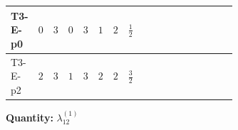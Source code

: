 \documentclass[8pt]{article}
\begin{document}
\begin{landscape}
\begin{longtable}{@{}llcccccc >{\raggedright\arraybackslash}p{0.21\linewidth} >{\raggedright\arraybackslash}p{0.21\linewidth} >{\raggedright\arraybackslash}p{0.21\linewidth}@{}}
T3-E-p0 & $0$ & $3$ & $0$ & $3$ & $1$ & $2$ & $\frac{1}{2}$ & \scriptsize\adjustbox{max width=\linewidth}{$\begin{gathered} +{g_1}^2 (-6 {\lambda_{12}^{(1)}}-4 {\lambda_{12}^{(\times)}})\end{gathered}$} & \scriptsize\adjustbox{max width=\linewidth}{$\begin{gathered} +{\lambda_{S_1}^{(1)}} \left(8 {\lambda_{12}^{(1)}}+\frac{16 {\lambda_{12}^{(\times)}}}{3}\right)\end{gathered}$} & \scriptsize\adjustbox{max width=\linewidth}{$\begin{gathered} +{\lambda_{S_2}^{(1)}} \left(8 {\lambda_{12}^{(1)}}+\frac{16 {\lambda_{12}^{(\times)}}}{3}\right)\end{gathered}$} \\
\midrule
T3-E-p2 & $2$ & $3$ & $1$ & $3$ & $2$ & $2$ & $\frac{3}{2}$ & \scriptsize\adjustbox{max width=\linewidth}{$\begin{gathered} +{g_1}^2 (-30 {\lambda_{12}^{(1)}}-20 {\lambda_{12}^{(\times)}})\end{gathered}$} & \scriptsize\adjustbox{max width=\linewidth}{$\begin{gathered} +{\lambda_{S_1}^{(1)}} \left(8 {\lambda_{12}^{(1)}}+\frac{16 {\lambda_{12}^{(\times)}}}{3}\right)\end{gathered}$} & \scriptsize\adjustbox{max width=\linewidth}{$\begin{gathered} +{\lambda_{S_2}^{(1)}} \left(8 {\lambda_{12}^{(1)}}+\frac{16 {\lambda_{12}^{(\times)}}}{3}\right)\end{gathered}$} \\
\midrule
\bottomrule
\end{longtable}
\clearpage
\noindent\textbf{Quantity: }$\lambda_{12}^{(1)}$\par\smallskip

\end{landscape}
\end{document}
